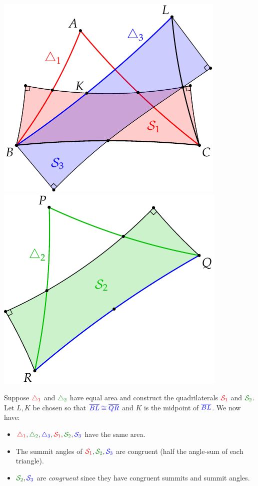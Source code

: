 \begin{center}
	\includegraphics{area-saccheri10}\qquad\qquad\includegraphics{area-saccheri8}
\end{center}

Suppose $\textcolor{red}{\triangle_1}$ and $\textcolor{Green}{\triangle_2}$ have equal area and construct the quadrilaterals $\textcolor{red}{\mathcal{S}_1}$ and $\textcolor{Green}{\cS_2}$. Let $L,K$ be chosen so that $\textcolor{blue}{\overline{BL}\cong\overline{QR}}$ and $K$ is the midpoint of $\textcolor{blue}{\overline{BL}}$. We now have:
\begin{itemize}
  \item $\textcolor{red}{\triangle_1}, \textcolor{Green}{\triangle_2}, \textcolor{blue}{\triangle_3}, \textcolor{red}{\cS_1}, \textcolor{Green}{\cS_2}, \textcolor{blue}{\cS_3}$ have the same area.
  \item The summit angles of $\textcolor{red}{\cS_1}, \textcolor{Green}{\cS_2}, \textcolor{blue}{\cS_3}$ are congruent (half the angle-sum of each triangle).
  \item $\textcolor{Green}{\cS_2}, \textcolor{blue}{\cS_3}$ are \emph{congruent} since they have congruent summits and summit angles.
\end{itemize}

